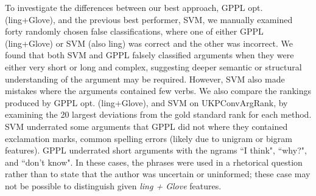 To investigate the differences between our best approach, GPPL opt. (ling+Glove), 
and the previous best performer, SVM, 
we manually examined forty randomly chosen false classifications, where one of 
either GPPL (ling+Glove) or SVM (also ling) was correct and the other was incorrect. 
We found that both SVM and GPPL falsely classified arguments when they were either very short or long and complex, suggesting deeper semantic or structural understanding of the argument may be required. However, SVM also made mistakes
where the arguments contained few verbs.
We also compare the rankings produced by GPPL opt. (ling+Glove), 
and SVM on UKPConvArgRank, by examining the 20 largest deviations from the 
gold standard rank for each method. SVM underrated some arguments that GPPL did not where they contained
exclamation marks, common spelling errors (likely due to unigram or bigram features).
GPPL underrated short arguments with the ngrams ``I think", ``why?", and
``don't know". In these cases, the phrases were used in a rhetorical question 
rather than to state that the author was uncertain or uninformed; these case
may not be possible to distinguish given \emph{ling + Glove} features.

